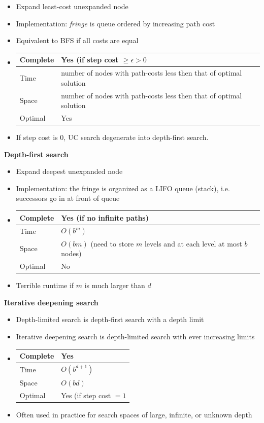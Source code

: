 \documentclass{scrartcl}
\begin{document}
\begin{itemize}
    \item
        Expand least-cost unexpanded node
    \item
        Implementation: \textit{fringe} is queue ordered by increasing path cost
    \item
        Equivalent to BFS if all costs are equal
    \item
        \begin{tabular}{|l|l|}
            \hline
            Complete & Yes (if step cost $\geq \epsilon > 0$\\ \hline
            Time & number of nodes with path-costs less then that of optimal solution\\ \hline
            Space & number of nodes with path-costs less then that of optimal solution\\ \hline
            Optimal & Yes\\ \hline
        \end{tabular}
    \item
        If step cost is 0, UC search degenerate into depth-first search.
\end{itemize}
\textbf{Depth-first search}
\begin{itemize}
    \item
        Expand deepest unexpanded node
    \item
        Implementation: the fringe is organized as a LIFO queue (stack), i.e. successors go in at front of queue
    \item
        \begin{tabular}{|l|l|}
            \hline
            Complete & Yes (if no infinite paths)\\ \hline
            Time & $O(b^m)$ \\ \hline
            Space & $O(bm)$ (need to store $m$ levels and at each level at most $b$ nodes)\\ \hline
            Optimal & No\\ \hline
        \end{tabular}
    \item
        Terrible runtime if $m$ is much larger than $d$
\end{itemize}
\textbf{Iterative deepening search}
\begin{itemize}
    \item
        Depth-limited search is depth-first search with a depth limit
    \item
        Iterative deepening search is depth-limited search with ever increasing limits
    \item
        \begin{tabular}{|l|l|}
            \hline
            Complete & Yes\\ \hline
            Time & $O(b^{d+1})$\\ \hline
            Space & $O(bd)$\\ \hline
            Optimal & Yes (if step cost $=1$\\ \hline
        \end{tabular}
    \item
        Often used in practice for search spaces of large, infinite, or unknown depth
\end{itemize}
\end{document}
